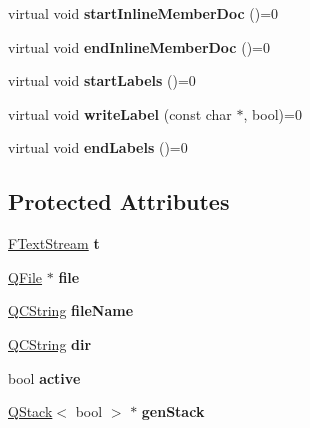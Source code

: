 \begin{DoxyCompactItemize}
virtual void {\bfseries start\+Inline\+Member\+Doc} ()=0
\item 
\mbox{\label{class_output_generator_a59987a7b4a41789d80dd788b0f65c434}} 
virtual void {\bfseries end\+Inline\+Member\+Doc} ()=0
\item 
\mbox{\label{class_output_generator_af317d904e65624244c58368deabcba55}} 
virtual void {\bfseries start\+Labels} ()=0
\item 
\mbox{\label{class_output_generator_a40864f2cdb9de3605965ec2912c3709d}} 
virtual void {\bfseries write\+Label} (const char $\ast$, bool)=0
\item 
\mbox{\label{class_output_generator_a13875bb6d9d678dac1ae21b3ad97127a}} 
virtual void {\bfseries end\+Labels} ()=0
\end{DoxyCompactItemize}
\subsection*{Protected Attributes}
\begin{DoxyCompactItemize}
\item 
\mbox{\label{class_output_generator_a55a40a8215efe6adc4d0a587ad9a46bc}} 
\mbox{\hyperlink{class_f_text_stream}{F\+Text\+Stream}} {\bfseries t}
\item 
\mbox{\label{class_output_generator_aed5ad11c3844cdf71ec6fee6c1c84286}} 
\mbox{\hyperlink{class_q_file}{Q\+File}} $\ast$ {\bfseries file}
\item 
\mbox{\label{class_output_generator_a9bb808101dbeae7732bb0fa66cad9176}} 
\mbox{\hyperlink{class_q_c_string}{Q\+C\+String}} {\bfseries file\+Name}
\item 
\mbox{\label{class_output_generator_ac64b8818d57bbe250f647d7b10edd45e}} 
\mbox{\hyperlink{class_q_c_string}{Q\+C\+String}} {\bfseries dir}
\item 
\mbox{\label{class_output_generator_a1e1299d64814f58ac06b257992291f9f}} 
bool {\bfseries active}
\item 
\mbox{\label{class_output_generator_ac734ecb37a17e3b4fa46f249ab495697}} 
\mbox{\hyperlink{class_q_stack}{Q\+Stack}}$<$ bool $>$ $\ast$ {\bfseries gen\+Stack}
\end{DoxyCompactItemize}


